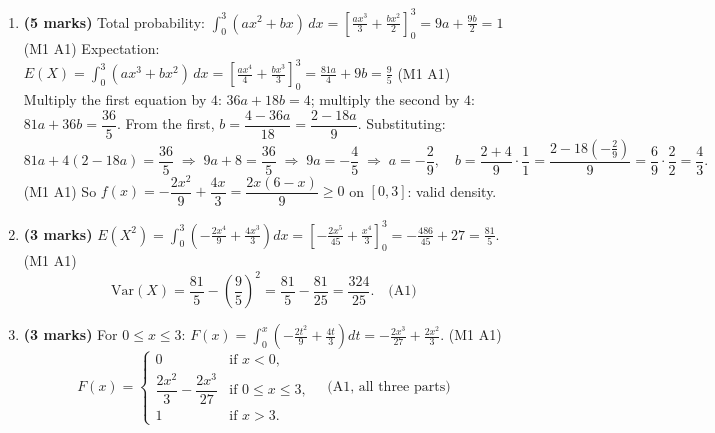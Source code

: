 \documentclass[11pt]{article}
\begin{document}
\begin{corrige}
\begin{enumerate}
\item \textbf{(5 marks)} Total probability: $\displaystyle\int_0^3 (ax^2+bx)\,dx=\left[\frac{ax^3}{3}+\frac{bx^2}{2}\right]_0^3=9a+\frac{9b}{2}=1$ \hfill(M1 A1)
Expectation: $E(X)=\displaystyle\int_0^3 (ax^3+bx^2)\,dx=\left[\frac{ax^4}{4}+\frac{bx^3}{3}\right]_0^3=\frac{81a}{4}+9b=\frac95$ \hfill(M1 A1)
Multiply the first equation by $4$: $36a+18b=4$; multiply the second by $4$: $81a+36b=\dfrac{36}{5}$. From the first, $b=\dfrac{4-36a}{18}=\dfrac{2-18a}{9}$. Substituting:
\[
81a+4(2-18a)=\frac{36}{5}\;\Longrightarrow\;9a+8=\frac{36}{5}\;\Longrightarrow\;9a=-\frac{4}{5}\;\Longrightarrow\;a=-\frac{2}{9},\quad b=\frac{2+4}{9}\cdot\frac{1}{1}=\frac{2-18(-\frac29)}{9}=\frac{6}{9}\cdot\frac{2}{2}=\frac{4}{3}.
\]
\hfill(M1 A1) \quad So $f(x)=-\dfrac{2x^2}{9}+\dfrac{4x}{3}=\dfrac{2x(6-x)}{9}\geq 0$ on $[0,3]$: valid density.

\item \textbf{(3 marks)} $E(X^2)=\displaystyle\int_0^3\left(-\frac{2x^4}{9}+\frac{4x^3}{3}\right)dx=\left[-\frac{2x^5}{45}+\frac{x^4}{3}\right]_0^3=-\frac{486}{45}+27=\frac{81}{5}$. \hfill(M1 A1)
\[
\mathrm{Var}(X)=\frac{81}{5}-\left(\frac95\right)^2=\frac{81}{5}-\frac{81}{25}=\frac{324}{25}. \quad\text{(A1)}
\]

\item \textbf{(3 marks)} For $0\leq x\leq 3$: $F(x)=\displaystyle\int_0^x\left(-\frac{2t^2}{9}+\frac{4t}{3}\right)dt=-\frac{2x^3}{27}+\frac{2x^2}{3}$. \hfill(M1 A1)
\[
F(x)=\begin{cases} 0 & \text{if } x<0,\\ \dfrac{2x^2}{3}-\dfrac{2x^3}{27} & \text{if } 0\leq x\leq 3,\\ 1 & \text{if } x>3.\end{cases} \quad\text{(A1, all three parts)}
\]


\end{enumerate}
\end{corrige}
\end{document}
